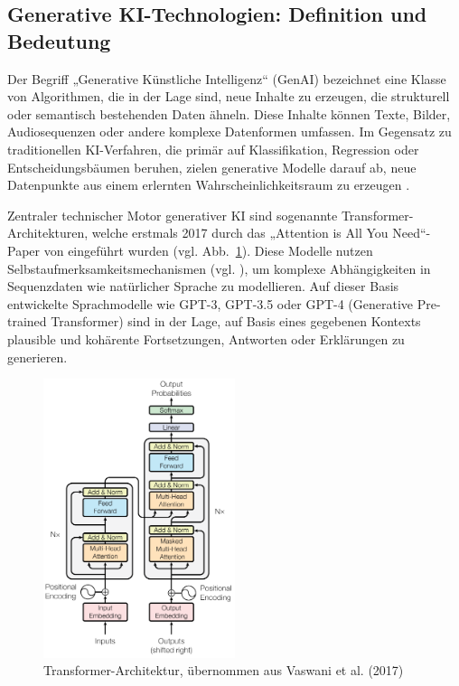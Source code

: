 \documentclass[a4paper,12pt]{article}
\begin{document}
\subsection{Generative KI-Technologien: Definition und Bedeutung}
Der Begriff „Generative Künstliche Intelligenz“ (GenAI) bezeichnet eine Klasse von Algorithmen, die in der Lage sind, neue Inhalte zu erzeugen, die strukturell oder semantisch bestehenden Daten ähneln. Diese Inhalte können Texte, Bilder, Audiosequenzen oder andere komplexe Datenformen umfassen. Im Gegensatz zu traditionellen KI-Verfahren, die primär auf Klassifikation, Regression oder Entscheidungsbäumen beruhen, zielen generative Modelle darauf ab, neue Datenpunkte aus einem erlernten Wahrscheinlichkeitsraum zu erzeugen \parencite{mitkov}.

Zentraler technischer Motor generativer KI sind sogenannte Transformer-Architekturen, welche erstmals 2017 durch das „Attention is All You Need“-Paper von \textcite{vaswani2017attention} eingeführt wurden (vgl. Abb.~\ref{fig:transformer}). Diese Modelle nutzen Selbstaufmerksamkeitsmechanismen (vgl. \textcite{vaswani2017attention}), um komplexe Abhängigkeiten in Sequenzdaten wie natürlicher Sprache zu modellieren. Auf dieser Basis entwickelte Sprachmodelle wie GPT-3, GPT-3.5 oder GPT-4 (Generative Pre-trained Transformer) sind in der Lage, auf Basis eines gegebenen Kontexts plausible und kohärente Fortsetzungen, Antworten oder Erklärungen zu generieren.

\begin{figure}[H]
    \centering
    \includegraphics[width=0.5\textwidth]{Bilder/Transformer-Modell}
   \caption{Transformer-Architektur, übernommen aus Vaswani et al. (2017) \cite{vaswani2017attention}}
    \label{fig:transformer}
\end{figure}
\end{document}
